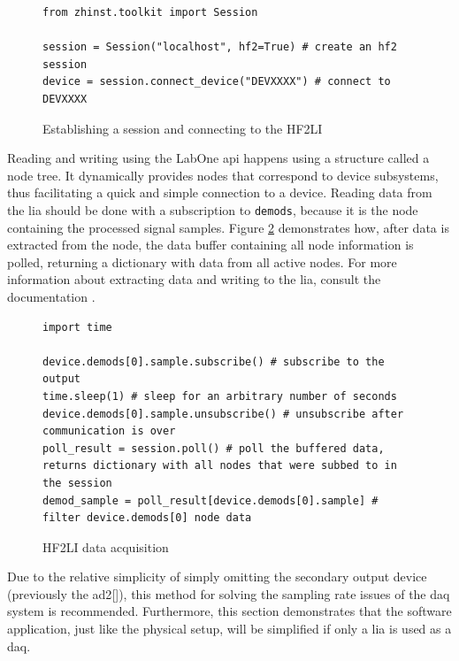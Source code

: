 \begin{figure}[!ht]
	\begin{lstlisting}[language=pythe]
from zhinst.toolkit import Session
		
session = Session("localhost", hf2=True) # create an hf2 session
device = session.connect_device("DEVXXXX") # connect to DEVXXXX
	\end{lstlisting}
	\caption{Establishing a session and connecting to the HF2LI}
	\label{fig:rec:server}
\end{figure}



Reading and writing using the LabOne \gls{api} happens using a structure called a node tree. It dynamically provides nodes that correspond to device subsystems, thus facilitating a quick and simple connection to a device. Reading data from the \gls{lia} should be done with a subscription to \lstinline|demods|, because it is the node containing the processed signal samples. Figure \ref{fig:rec:demods} demonstrates how, after data is extracted from the node, the data buffer containing all node information is polled, returning a dictionary with data from all active nodes. For more information about extracting data and writing to the \gls{lia}, consult the documentation \cite{zh_docs_node_tree}.

\begin{figure}[!ht]
	\begin{lstlisting}[language=pythe]
import time
		
device.demods[0].sample.subscribe() # subscribe to the output
time.sleep(1) # sleep for an arbitrary number of seconds
device.demods[0].sample.unsubscribe() # unsubscribe after communication is over
poll_result = session.poll() # poll the buffered data, returns dictionary with all nodes that were subbed to in the session
demod_sample = poll_result[device.demods[0].sample] # filter device.demods[0] node data 
	\end{lstlisting}
	\caption{HF2LI data acquisition}
	\label{fig:rec:demods}
\end{figure}

Due to the relative simplicity of simply omitting the secondary output device (previously the \gls{ad2}[]), this method for solving the sampling rate issues of the \gls{daq} system is recommended. Furthermore, this section demonstrates that the software application, just like the physical setup, will be simplified if only a \gls{lia} is used as a \gls{daq}.